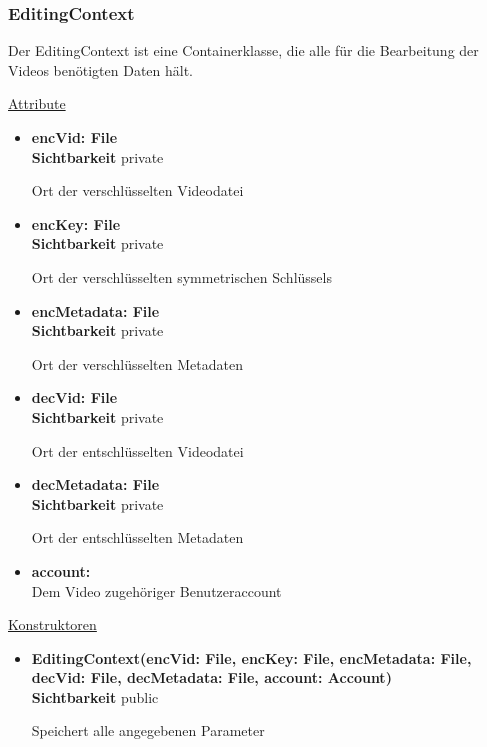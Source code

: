 \subsubsection{EditingContext} \label{service:klasse:EditingContext}
Der EditingContext ist eine Containerklasse, die alle für die Bearbeitung der Videos benötigten Daten hält. \newline

\underline{Attribute}
\begin{itemize}
\itemsep0pt
\item \textbf{encVid: File} \hfill\\ 
\textbf{Sichtbarkeit} private

Ort der verschlüsselten Videodatei

\item \textbf{encKey: File} \hfill\\ 
\textbf{Sichtbarkeit} private

Ort der verschlüsselten symmetrischen Schlüssels

\item \textbf{encMetadata: File} \hfill\\
\textbf{Sichtbarkeit} private
 
Ort der verschlüsselten Metadaten

\item \textbf{decVid: File} \hfill\\ 
\textbf{Sichtbarkeit} private

Ort der entschlüsselten Videodatei

\item \textbf{decMetadata: File} \hfill\\ 
\textbf{Sichtbarkeit} private

Ort der entschlüsselten Metadaten

\item \textbf{account: } \hfill\\ 
Dem Video zugehöriger Benutzeraccount
\end{itemize}

\underline{Konstruktoren}
\begin{itemize}
\itemsep0pt
\item \textbf{EditingContext(encVid: File, encKey: File, encMetadata: File, 
decVid: File, decMetadata: File, account: Account)} \hfill\\
\textbf{Sichtbarkeit} public

Speichert alle angegebenen Parameter
\end{itemize}